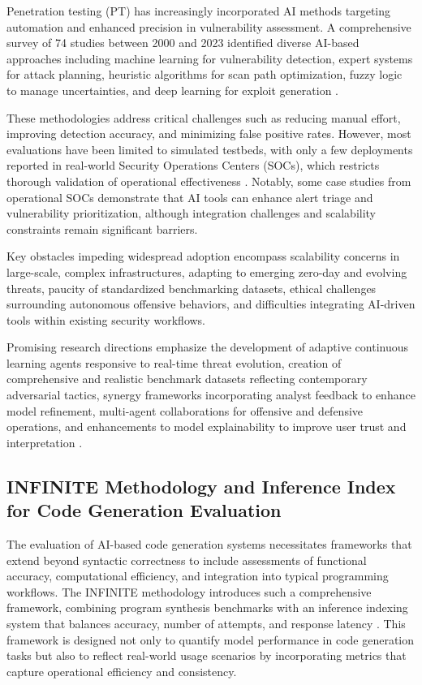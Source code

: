 \documentclass[sigconf]{acmart}
\begin{document}
Penetration testing (PT) has increasingly incorporated AI methods targeting automation and enhanced precision in vulnerability assessment. A comprehensive survey of 74 studies between 2000 and 2023 identified diverse AI-based approaches including machine learning for vulnerability detection, expert systems for attack planning, heuristic algorithms for scan path optimization, fuzzy logic to manage uncertainties, and deep learning for exploit generation \cite{ref31}.

These methodologies address critical challenges such as reducing manual effort, improving detection accuracy, and minimizing false positive rates. However, most evaluations have been limited to simulated testbeds, with only a few deployments reported in real-world Security Operations Centers (SOCs), which restricts thorough validation of operational effectiveness \cite{ref31}. Notably, some case studies from operational SOCs demonstrate that AI tools can enhance alert triage and vulnerability prioritization, although integration challenges and scalability constraints remain significant barriers.

Key obstacles impeding widespread adoption encompass scalability concerns in large-scale, complex infrastructures, adapting to emerging zero-day and evolving threats, paucity of standardized benchmarking datasets, ethical challenges surrounding autonomous offensive behaviors, and difficulties integrating AI-driven tools within existing security workflows.

Promising research directions emphasize the development of adaptive continuous learning agents responsive to real-time threat evolution, creation of comprehensive and realistic benchmark datasets reflecting contemporary adversarial tactics, synergy frameworks incorporating analyst feedback to enhance model refinement, multi-agent collaborations for offensive and defensive operations, and enhancements to model explainability to improve user trust and interpretation \cite{ref31}.

\subsection{INFINITE Methodology and Inference Index for Code Generation Evaluation}

The evaluation of AI-based code generation systems necessitates frameworks that extend beyond syntactic correctness to include assessments of functional accuracy, computational efficiency, and integration into typical programming workflows. The INFINITE methodology introduces such a comprehensive framework, combining program synthesis benchmarks with an inference indexing system that balances accuracy, number of attempts, and response latency \cite{ref9}. This framework is designed not only to quantify model performance in code generation tasks but also to reflect real-world usage scenarios by incorporating metrics that capture operational efficiency and consistency.
\end{document}
